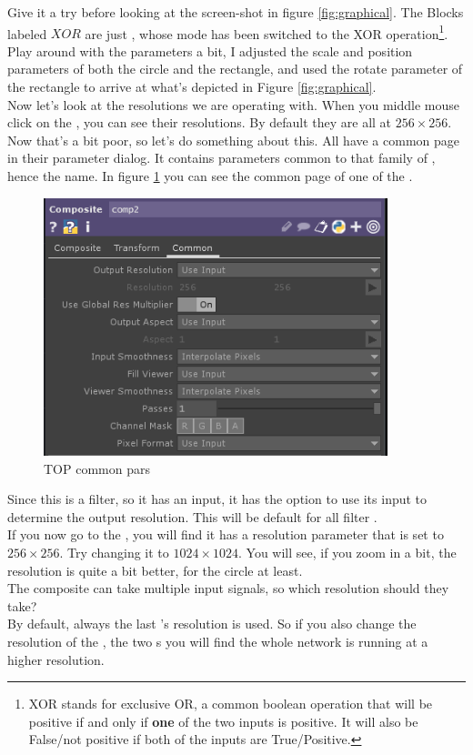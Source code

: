 Give it a try before looking at the screen-shot in figure \ref{fig:graphical}. The Blocks labeled $XOR$ are just  \TOPs, whose mode has been switched to the XOR operation\footnote{XOR stands for exclusive OR, a common boolean operation that will be positive if and only if \textbf{one} of the two inputs is positive. It will also be False/not positive if both of the inputs are True/Positive.}.\\
Play around with the parameters a bit, I adjusted the scale and position parameters of both the circle and the rectangle, and used the rotate parameter of the rectangle to arrive at what's depicted in Figure \ref{fig:graphical}.\\
Now let's look at the resolutions we are operating with. When you middle mouse click on the \OPs, you can see their resolutions. By default they are all at $256 \times 256$. Now that's a bit poor, so let's do something about this. All \OPs have a common page in their parameter dialog. It contains parameters common to that family of \OPs, hence the name. In figure \ref{fig:topCommon} you can see the common page of one of the  \TOPs.
\begin{figure}[H]
	\centering
	\includegraphics[width=10cm]{img/TOPcommonPars.PNG}
	\caption[TOP common parameters]
	{TOP common pars}
	\label{fig:topCommon}
\end{figure}


Since this \OP is a \glqq{}filter\grqq{}, so it has an input, it has the option to use its input to determine the output resolution. This will be default for all filter \OPs.\\
If you now go to the , you will find it has a resolution parameter that is set to $256 \times 256$. Try changing it to $1024\times1024$. You will see, if you zoom in a bit, the resolution is quite a bit better, for the circle at least.\\
The composite \OPs can take multiple input signals, so which resolution should they take?\\
By default, always the last \OP's resolution is used. So if you also change the resolution of the , the two s you will find the whole network is running at a higher resolution.



